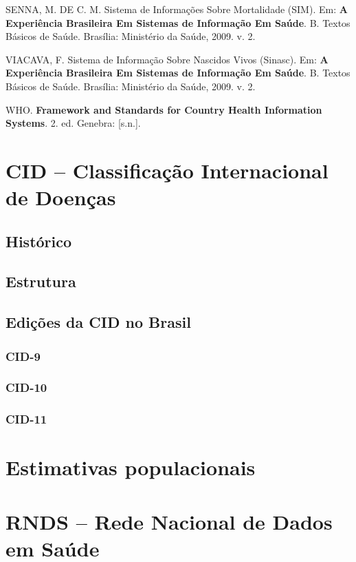 \documentclass[
  letterpaper,
  DIV=11,
  numbers=noendperiod]{scrreprt}
\newlength{\cslhangindent}
\newenvironment{CSLReferences}[2] %
 {\begin{list}{}{%
  \setlength{\itemindent}{0pt}
  \setlength{\leftmargin}{0pt}
  \setlength{\parsep}{0pt}
  \ifodd #1
   \setlength{\leftmargin}{\cslhangindent}
   \setlength{\itemindent}{-1\cslhangindent}
  \fi
  \setlength{\itemsep}{#2\baselineskip}}}
 {\end{list}}
\begin{document}
\begin{CSLReferences}{0}{1}
SENNA, M. DE C. M. Sistema de {Informa{ç}{õ}es} Sobre {Mortalidade}
({SIM}). Em: \textbf{A Experi{ê}ncia Brasileira Em Sistemas de
Informa{ç}{ã}o Em Sa{ú}de}. B. {Textos B{á}sicos} de {Sa{ú}de}.
Bras{í}lia: Minist{é}rio da Sa{ú}de, 2009. v. 2.

VIACAVA, F. Sistema de {Informa{ç}{ã}o} Sobre {Nascidos Vivos}
({Sinasc}). Em: \textbf{A Experi{ê}ncia Brasileira Em Sistemas de
Informa{ç}{ã}o Em Sa{ú}de}. B. {Textos B{á}sicos} de {Sa{ú}de}.
Bras{í}lia: Minist{é}rio da Sa{ú}de, 2009. v. 2.

WHO. \textbf{Framework and Standards for Country Health Information
Systems}. 2. ed. Genebra: {[}s.n.{]}.

\end{CSLReferences}

\cleardoublepage
{}
{}
\appendix

\chapter{CID -- Classificação Internacional de
Doenças}\label{cid-classificauxe7uxe3o-internacional-de-doenuxe7as}

\section{Histórico}\label{histuxf3rico}

\section{Estrutura}\label{estrutura}

\section{Edições da CID no Brasil}\label{ediuxe7uxf5es-da-cid-no-brasil}

\subsection{CID-9}\label{cid-9}

\subsection{CID-10}\label{cid-10}

\subsection{CID-11}\label{cid-11}

\chapter{Estimativas populacionais}\label{estimativas-populacionais}

\chapter{RNDS -- Rede Nacional de Dados em
Saúde}\label{rnds-rede-nacional-de-dados-em-sauxfade}
\end{document}
